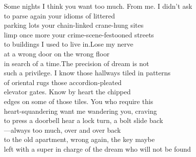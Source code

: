 \documentclass[parskip=full,12pt,oneside,openany,a5paper,numbers=endperiod]{scrbook}
\begin{document}
Some nights I think you want too much. From me. I didn't ask\\
to parse again your idioms of littered\\
parking lots your chain-linked crane-hung sites\\
limp once more your crime-scene-festooned streets\\
to buildings I used to live in.\quad Lose my nerve\\
at a wrong door on the wrong floor\\
in search of a time.\quad The precision of dream is not\\
such a privilege. I know those hallways tiled in patterns\\
of oriental rugs those accordion-pleated\\
elevator gates. Know by heart the chipped\\
edges on some of those tiles. You who require this\\
heart-squandering want me wandering you, craving\\
to press a doorbell hear a lock turn, a bolt slide back\\
---always too much, over and over back\\
to the old apartment, wrong again, the key maybe\\
left with a super in charge of the dream who will not be found

\end{document}
